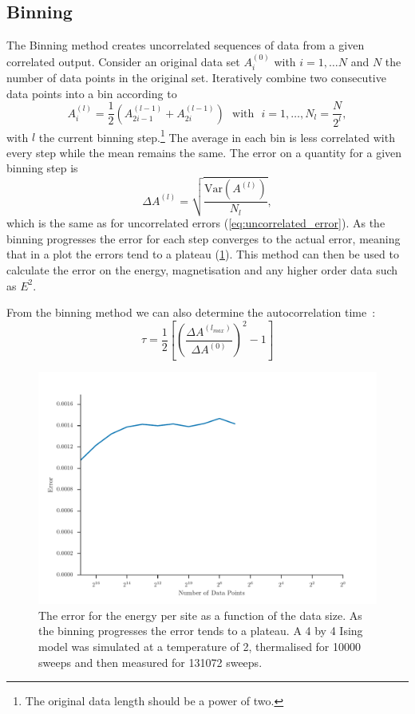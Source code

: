 \documentclass[11pt, a4paper]{report} %
\begin{document}
\subsection{Binning}

The Binning method creates uncorrelated sequences of data from a given correlated output.
Consider an original data set \(A_i^{(0)}\) with \(i = 1, \ldots N\) and \(N\) the number of data points in the original set.
Iteratively combine two consecutive data points into a bin according to
\begin{equation}
	A_i^{(l)} = \frac{1}{2} \left(A_{2i-1}^{(l-1)} + A_{2i}^{(l-1)} \right) \mathrm{\ \ \ with \ \ \ } i = 1, \ldots, N_l = \frac{N}{2^l},
\end{equation}
with \(l\) the current binning step.\footnote{The original data length should be a power of two.}
The average in each bin is less correlated with every step while the mean remains the same.
The error on a quantity for a given binning step is
\begin{equation}
	\label{eq:basic_error}
	\Delta A^{(l)} = \sqrt{\frac{\mathrm{Var}(A^{(l)})}{N_l}},
\end{equation}
which is the same as for uncorrelated errors (\cref{eq:uncorrelated_error}).
As the binning progresses the error for each step converges to the actual error, meaning that in a plot the errors tend to a plateau (\cref{fig:binning_error_convergence}).
This method can then be used to calculate the error on the energy, magnetisation and any higher order data such as \(E^2\).

From the binning method we can also determine the autocorrelation time~\cite{corboz}:
\begin{equation}
	\tau = \frac{1}{2} \left[\left( \frac{\Delta A^{(l_{max})}}{\Delta A^{(0)}} \right)^2- 1 \right]
\end{equation}
\begin{figure}[htb]
	\centering
	\includegraphics[width=\linewidth]{ising_metropolis_energy_per_site_error_binning.pdf}
	\caption{The error for the energy per site as a function of the data size. As the binning progresses the error tends to a plateau. A 4 by 4 Ising model was simulated at a temperature of 2, thermalised for 10000 sweeps and then measured for 131072 sweeps.}
	\label{fig:binning_error_convergence}
\end{figure}
\end{document}

